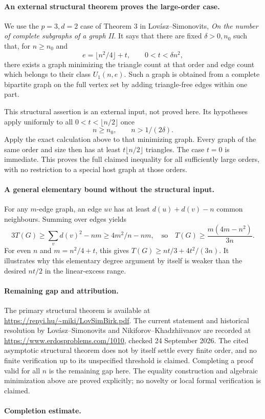 \paragraph{An external structural theorem proves the large-order case.}
We use the \(p=3,d=2\) case of Theorem 3 in Lov\'asz--Simonovits, \emph{On the number of complete subgraphs of a graph II}. It says that there are fixed \(\delta>0,n_0\) such that, for \(n\geq n_0\) and
\[
 e=\lfloor n^2/4\rfloor+t,\qquad 0<t<\delta n^2,
\]
there exists a graph minimizing the triangle count at that order and edge count which belongs to their class \(U_1(n,e)\). Such a graph is obtained from a complete bipartite graph on the full vertex set by adding triangle-free edges within one part.

This structural assertion is an external input, not proved here. Its hypotheses apply uniformly to all \(0<t<\lfloor n/2\rfloor\) once
\[
 n\geq n_0,\qquad n>1/(2\delta).
\]
Apply the exact calculation above to that minimizing graph. Every graph of the same order and size then has at least \(t\lfloor n/2\rfloor\) triangles. The case \(t=0\) is immediate. This proves the full claimed inequality for all sufficiently large orders, with no restriction to a special host graph at those orders.

\paragraph{A general elementary bound without the structural input.}
For any \(m\)-edge graph, an edge \(uv\) has at least \(d(u)+d(v)-n\) common neighbours. Summing over edges yields
\[
 3T(G)\geq\sum_vd(v)^2-nm\geq4m^2/n-nm,
 \quad\text{so}\quad
 T(G)\geq\frac{m(4m-n^2)}{3n}.
\]
For even \(n\) and \(m=n^2/4+t\), this gives
\(T(G)\geq nt/3+4t^2/(3n)\). It illustrates why this elementary degree argument by itself is weaker than the desired \(nt/2\) in the linear-excess range.

\paragraph{Remaining gap and attribution.}
The primary structural theorem is available at \url{https://renyi.hu/~miki/LovSimBirk.pdf}. The current statement and historical resolution by Lov\'asz--Simonovits and Nikiforov--Khadzhiivanov are recorded at \url{https://www.erdosproblems.com/1010}, checked 24 September 2026. The cited asymptotic structural theorem does not by itself settle every finite order, and no finite verification up to its unspecified threshold is claimed. Completing a proof valid for all \(n\) is the remaining gap here. The equality construction and algebraic minimization above are proved explicitly; no novelty or local formal verification is claimed.

\paragraph{Completion estimate.}
